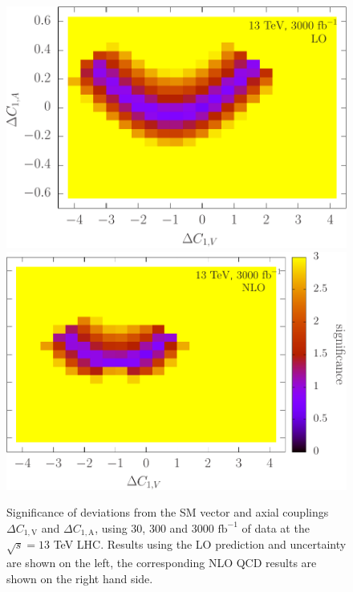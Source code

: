 \documentclass{JHEP3}
\def\invfb {\mathrm{fb}^{-1}}
\def\DConeA{\Delta C_{1,\mathrm{A}}}
\def\DConeV{\Delta C_{1,\mathrm{V}}}
\begin{document}
\begin{figure}[t]
\\
\includegraphics[scale=0.503]{LHC_53_LLSign_13LO3000.pdf} 
\includegraphics[scale=0.5]{LHC_53_LLSign_13NLO3000.pdf} 
\caption{\label{fig:ix} Significance of deviations from the SM vector and axial couplings $\DConeV$ and $\DConeA$,  using 30, 300 and 3000 $\invfb$ of data at the $\sqrt{s}=13$ TeV LHC. 
Results using the LO prediction and uncertainty are shown on the left, the corresponding NLO QCD results are shown on the right hand side.}
\end{figure}
\end{document}
